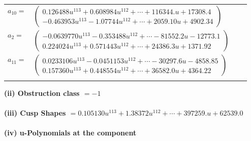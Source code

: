 \documentclass[1p]{elsarticle_modified}
\theoremstyle{definition}
\begin{document}
\begin{tabular}{m{7pt} m{180pt} m{7pt} m{180pt} }
\flushright $a_{10}=$&$\begin{pmatrix}0.126488 u^{113}+0.608984 u^{112}+\cdots+116344. u+17308.4\\-0.463953 u^{113}-1.07744 u^{112}+\cdots+2059.10 u+4902.34\end{pmatrix}$ \\
\flushright $a_{2}=$&$\begin{pmatrix}-0.0639770 u^{113}-0.353488 u^{112}+\cdots-81552.2 u-12773.1\\0.224024 u^{113}+0.571443 u^{112}+\cdots+24386.3 u+1371.92\end{pmatrix}$ \\
\flushright $a_{11}=$&$\begin{pmatrix}0.0233106 u^{113}-0.0451153 u^{112}+\cdots-30297.6 u-4858.85\\0.157360 u^{113}+0.448554 u^{112}+\cdots+36582.0 u+4364.22\end{pmatrix}$\\&\end{tabular}
\flushleft \textbf{(ii) Obstruction class $= -1$}\\~\\
\flushleft \textbf{(iii) Cusp Shapes $= 0.105130 u^{113}+1.38372 u^{112}+\cdots+397259. u+62539.0$}\\~\\
\newpage\renewcommand{\arraystretch}{1}
\flushleft \textbf{(iv) u-Polynomials at the component}\newline \\
\end{document}
